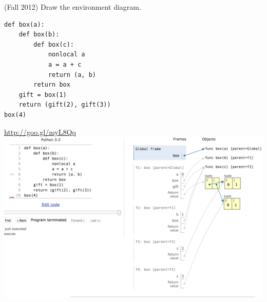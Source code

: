 \question (Fall 2012) Draw the environment diagram.

\begin{lstlisting}
def box(a):
    def box(b):
        def box(c):
            nonlocal a
            a = a + c
            return (a, b)
        return box
    gift = box(1)
    return (gift(2), gift(3))
box(4)
\end{lstlisting}

\begin{solution}[2in]
\url{http://goo.gl/myL8Qq} \newline
\includegraphics[scale=.5]{box.png}
\end{solution}
